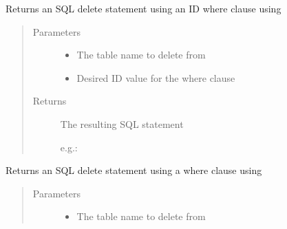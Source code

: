 \documentclass[letterpaper,10pt,english]{sphinxmanual}
\begin{document}
\begin{fulllineitems}
\begin{fulllineitems}
\label{\detokenize{src:src.Database.DatabaseStatements.getDeleteByIDStatement}}
Returns an SQL delete statement using an ID where clause using {\hyperref[\detokenize{src:src.Database.DatabaseStatements.getDeleteByValueStatement}]{}}
\begin{quote}\begin{description}
\item[{Parameters}] \leavevmode\begin{itemize}
\item {} 
 \textendash{} The table name to delete from

\item {} 
 \textendash{} Desired ID value for the where clause

\end{itemize}

\item[{Returns}] \leavevmode

The resulting SQL statement

e.g.: 


\end{description}\end{quote}

\end{fulllineitems}


\begin{fulllineitems}
\label{\detokenize{src:src.Database.DatabaseStatements.getDeleteByValueStatement}}
Returns an SQL delete statement using a where clause using {\hyperref[\detokenize{src:src.Database.DatabaseStatements.getDeleteByValueStatement}]{}}
\begin{quote}\begin{description}
\item[{Parameters}] \leavevmode\begin{itemize}
\item {} 
 \textendash{} The table name to delete from


\end{itemize}
\end{description}
\end{quote}
\end{fulllineitems}
\end{fulllineitems}
\end{document}
